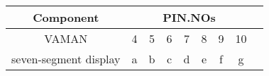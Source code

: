 \begin{tabular}{|c|c|c|c|c|c|c|c|c|}
\hline Component & \multicolumn{7}{|c|}{PIN.NOs} \\
\hline VAMAN & 4 & 5 & 6 & 7 & 8 & 9 & 10 \\
\hline seven-segment display & a & b & c & d & e & f & g \\
\hline
\end{tabular}


